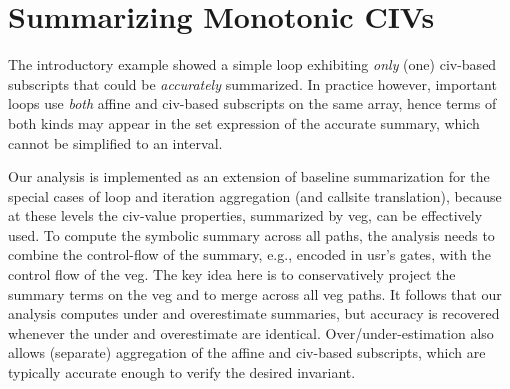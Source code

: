 \documentclass{sig-alternate}
\begin{document}
\section{Summarizing Monotonic CIVs}
\label{sec:MonotonicCiv}

The introductory example showed a simple loop exhibiting 
{\em only} (one) {\sc civ}-based subscripts that could be
{\em accurately} summarized.
%
In practice however, important loops use {\em both} %
affine and {\sc civ}-based subscripts on the same array, hence 
terms of both kinds may appear in the set expression %
of the accurate summary, which cannot be simplified
to an interval.

Our analysis is implemented as an extension of baseline 
summarization for the special cases of loop and iteration 
aggregation (and callsite translation), because at these 
levels the {\sc civ}-value properties, summarized by 
{\sc veg}, can be effectively used.
%
To compute the symbolic summary across all paths, the analysis
needs to combine the control-flow of the summary, e.g., 
encoded in {\sc usr}'s gates, with the control flow of the {\sc veg}. 
The key idea here is to conservatively project the summary terms 
on the {\sc veg} and to merge across all {\sc veg} paths.
It follows that our analysis computes under and overestimate
summaries, but accuracy is recovered whenever the under and 
overestimate are identical.
%
%
Over/under-estimation also allows (separate) aggregation of the 
affine and {\sc civ}-based subscripts, which are typically
accurate enough to verify the desired invariant.
%
\end{document}
